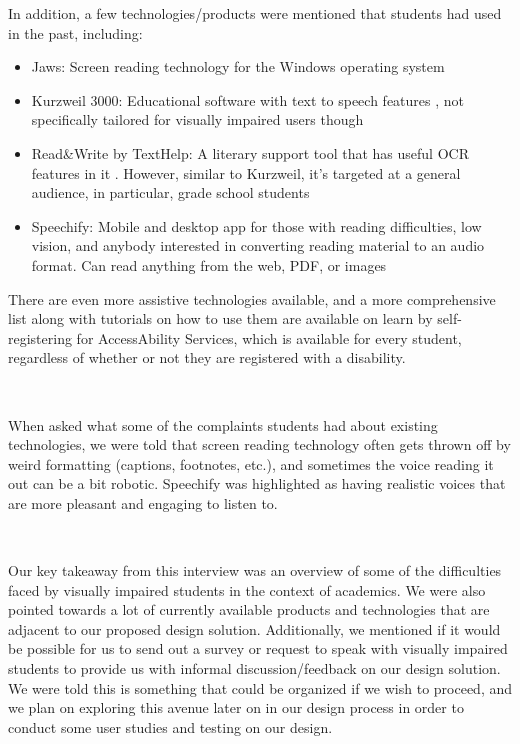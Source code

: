 \documentclass[a4paper,11pt]{article}
\begin{document}
\newpage
\noindent
In addition, a few technologies/products were mentioned that students had used in the past, including:
\begin{itemize}
    \item Jaws: Screen reading technology for the Windows operating system \cite{jaws-software}
    \item Kurzweil 3000: Educational software with text to speech features \cite{kurzweil}, not specifically tailored for visually impaired users though
    \item Read\&Write by TextHelp: A literary support tool that has useful OCR features in it \cite{read-and-write}. However, similar to Kurzweil, it's targeted at a general audience, in particular, grade school students
    \item Speechify: Mobile and desktop app for those with reading difficulties, low vision, and anybody interested in converting reading material to an audio format. Can read anything from the web, PDF, or images \cite{speechify}
\end{itemize}

\noindent
There are even more assistive technologies available, and a more comprehensive list along with tutorials on how to use them are available on learn by self-registering for AccessAbility Services, which is available for every student, regardless of whether or not they are registered with a disability.

\

\noindent
When asked what some of the complaints students had about existing technologies, we were told that screen reading technology often gets thrown off by weird formatting (captions, footnotes, etc.), and sometimes the voice reading it out can be a bit robotic. Speechify was highlighted as having realistic voices that are more pleasant and engaging to listen to.

\

\noindent
Our key takeaway from this interview was an overview of some of the difficulties faced by visually impaired students in the context of academics. We were also pointed towards a lot of currently available products and technologies that are adjacent to our proposed design solution. Additionally, we mentioned if it would be possible for us to send out a survey or request to speak with visually impaired students to provide us with informal discussion/feedback on our design solution. We were told this is something that could be organized if we wish to proceed, and we plan on exploring this avenue later on in our design process in order to conduct some user studies and testing on our design.
\end{document}
